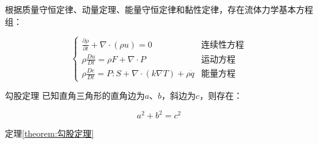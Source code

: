 

根据质量守恒定律、动量定理、能量守恒定律和黏性定律，存在流体力学基本方程组：

\begin{equation}
    \begin{cases}
        \frac{\partial\rho}{\partial t} + \nabla \cdot (\rho u) = 0 &\text{连续性方程}  \\
        \rho \frac{Du}{Dt} = \rho F + \nabla \cdot P &\text{运动方程}    \\
        \rho \frac{De}{Dt} = P:S + \nabla \cdot (k\nabla T) + \rho \dot{q}  &\text{能量方程}
    \end{cases}
\end{equation}



\begin{mcmTheorem}{勾股定理}
\label{theorem:勾股定理}
已知直角三角形的直角边为$a$、$b$，斜边为$c$，则存在：

\begin{equation}
    a^2 + b^2 = c^2
\end{equation}

\end{mcmTheorem}

定理\ref{theorem:勾股定理}

